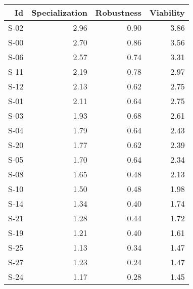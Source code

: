 \begin{tabular}{ | r | r | r | r | }
    \hline
                    Id  &  Specialization  &      Robustness  &       Viability  \\
    \hline
    \hline
                  S-02  &            2.96  &            0.90  &            3.86  \\
    \hline
                  S-00  &            2.70  &            0.86  &            3.56  \\
    \hline
                  S-06  &            2.57  &            0.74  &            3.31  \\
    \hline
                  S-11  &            2.19  &            0.78  &            2.97  \\
    \hline
                  S-12  &            2.13  &            0.62  &            2.75  \\
    \hline
                  S-01  &            2.11  &            0.64  &            2.75  \\
    \hline
                  S-03  &            1.93  &            0.68  &            2.61  \\
    \hline
                  S-04  &            1.79  &            0.64  &            2.43  \\
    \hline
                  S-20  &            1.77  &            0.62  &            2.39  \\
    \hline
                  S-05  &            1.70  &            0.64  &            2.34  \\
    \hline
                  S-08  &            1.65  &            0.48  &            2.13  \\
    \hline
                  S-10  &            1.50  &            0.48  &            1.98  \\
    \hline
                  S-14  &            1.34  &            0.40  &            1.74  \\
    \hline
                  S-21  &            1.28  &            0.44  &            1.72  \\
    \hline
                  S-19  &            1.21  &            0.40  &            1.61  \\
    \hline
                  S-25  &            1.13  &            0.34  &            1.47  \\
    \hline
                  S-27  &            1.23  &            0.24  &            1.47  \\
    \hline
                  S-24  &            1.17  &            0.28  &            1.45  \\

\end{tabular}
